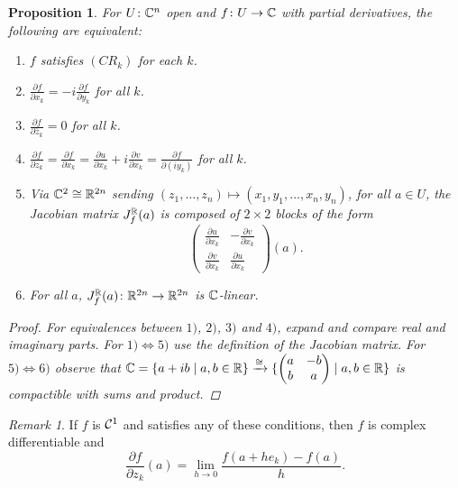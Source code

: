 \documentclass[A4paper, british]{amsart}
\theoremstyle{darkgreentheorem}
\newtheorem{prop}[thm]{Proposition}
\theoremstyle{darkbluedefinition}
\theoremstyle{darkredexample}
\theoremstyle{remark}
\newtheorem{rem}[thm]{Remark}
\newcommand{\1}{\mathbbm{1}}
\begin{document}
\begin{prop}
    For $U\colon \mathbb{C}^{n}$ open and $f\colon U\to \mathbb{C}$ with partial derivatives, the following are equivalent:
    \begin{enumerate}[label=\arabic*)]
	\item $f$ satisfies $(CR_{k})$ for each $k$.
	\item $\frac{\partial f}{\partial x_{k}}=-i\frac{\partial f}{\partial y_{k}}$ for all $k$.
	\item $\frac{\partial f}{\partial \bar{z}_{k}}=0$ for all $k$.
	\item $\frac{\partial f}{\partial z_{k}}=\frac{\partial f}{\partial x_{k}}=\frac{\partial u}{\partial x_{k}}+i\frac{\partial v}{\partial x_{k}}=\frac{\partial f}{\partial (iy_{k})}$ for all $k$.
	\item Via $\mathbb{C}^{2}\cong \mathbb{R}^{2n}$ sending $(z_{1},\ldots,z_{n})\mapsto (x_{1},y_{1},\ldots, x_{n},y_{n})$, for all $a\in U$, the Jacobian matrix  $J_{f}^{\mathbb{R}}(a)$ is composed of $2\times 2$ blocks of the form
	    \[ \begin{pmatrix} \frac{\partial u}{\partial x_{k}} & -\frac{\partial v}{\partial x_{k}} \\ \frac{\partial v}{\partial x_{k}} & \frac{\partial u}{\partial x_{k}}
	    \end{pmatrix}(a).\]
	\item For all $a$, $J_{f}^{\mathbb{R}}(a)\colon \mathbb{R}^{2n}\to \mathbb{R}^{2n}$ is $\mathbb{C}$-linear.
    \end{enumerate}
    \begin{proof}
	For equivalences between $1)$, $2)$, $3)$ and $4)$, expand and compare real and imaginary parts.
	For $1)\Leftrightarrow 5)$ use the definition of the Jacobian matrix.
	For $5)\Leftrightarrow 6)$ observe that $\mathbb{C}=\{a+ib\mid a,b\in \mathbb{R}\} \xrightarrow{\cong} \{ \begin{pmatrix} a & -b \\ b & a \end{pmatrix} \mid a,b\in \mathbb{R}\}$ is compactible with sums and product.
    \end{proof}
\end{prop}

\begin{rem}
    If $f$ is $\mathcal{C}^{1}$ and satisfies any of these conditions, then $f$ is complex differentiable and
    \[ \frac{\partial f}{\partial z_{k}}(a)=\lim_{h\to 0}\frac{f(a+he_{k})-f(a)}{h}.\]
\end{rem}
\end{document}

